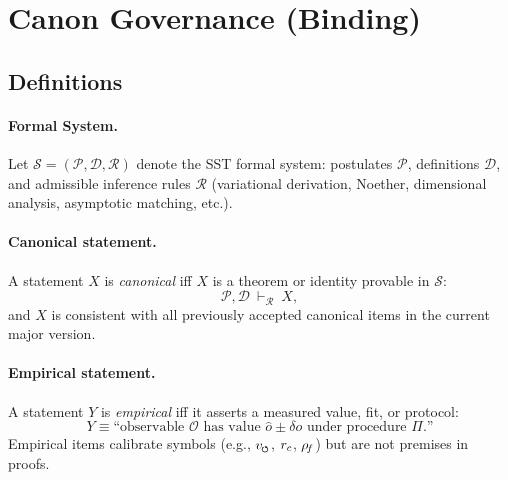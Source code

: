 \documentclass[11pt]{article}
\begin{document}
    \section{Canon Governance (Binding)}

    \subsection*{Definitions}
    \paragraph{Formal System.}
    Let \(\mathcal{S} = (\mathcal{P},\mathcal{D},\mathcal{R})\) denote the SST formal system:
    postulates \(\mathcal{P}\), definitions \(\mathcal{D}\), and admissible inference rules \(\mathcal{R}\)
    (variational derivation, Noether, dimensional analysis, asymptotic matching, etc.).

    \paragraph{Canonical statement.}
    A statement \(X\) is \emph{canonical} iff \(X\) is a theorem or identity provable in \(\mathcal{S}\):
    \[
        \mathcal{P},\mathcal{D}\ \vdash_{\mathcal{R}}\ X,
    \]
    and \(X\) is consistent with all previously accepted canonical items in the current major version.

    \paragraph{Empirical statement.}
    A statement \(Y\) is \emph{empirical} iff it asserts a measured value, fit, or protocol:
    \[
        Y \equiv \text{“observable } \mathcal{O} \text{ has value } \hat{o} \pm \delta o \text{ under procedure } \Pi\text{.”}
    \]
    Empirical items calibrate symbols (e.g., $\vscore$, $r_c$, $\rho_{\!f}$) but are not premises in proofs.
\end{document}
